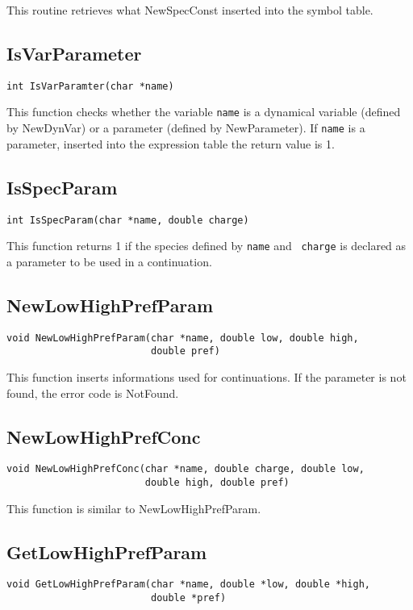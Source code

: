 This routine retrieves what NewSpecConst inserted into the symbol table.

\subsection{IsVarParameter}
\begin{verbatim}
int IsVarParamter(char *name)
\end{verbatim}

This function checks whether the variable {\tt name} is a dynamical
variable (defined by NewDynVar) or a parameter (defined by
NewParameter). If {\tt name} is a parameter, \ie inserted 
into the expression table the return value is 1.

\subsection{IsSpecParam}
\begin{verbatim}
int IsSpecParam(char *name, double charge)
\end{verbatim}

This function returns 1 if the species defined by {\tt name} and {\tt
  charge} is declared as a parameter to be used in a continuation.

\subsection{NewLowHighPrefParam}
\begin{verbatim}
void NewLowHighPrefParam(char *name, double low, double high, 
                         double pref)
\end{verbatim}

This function inserts informations used for continuations. If the
parameter is not found, the error code is NotFound.

\subsection{NewLowHighPrefConc}
\begin{verbatim}
void NewLowHighPrefConc(char *name, double charge, double low, 
                        double high, double pref)
\end{verbatim}

This function is similar to NewLowHighPrefParam.

\subsection{GetLowHighPrefParam}
\begin{verbatim}
void GetLowHighPrefParam(char *name, double *low, double *high,
                         double *pref)
\end{verbatim}

